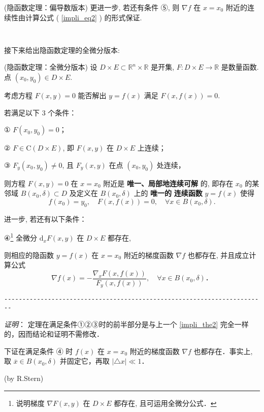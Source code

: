 \begin{theorem}{(隐函数定理：偏导数版本)}
更进一步, 若还有条件 ⑤, 则 $\nabla f$ 在 $x=x_{0}$ 附近的连续性由计算公式 ( \autoref{impli_eq2} ) 的形式保证. 
 \end{theorem}

\verb| |

接下来给出隐函数定理的全微分版本:
 \begin{theorem}{(隐函数定理：全微分版本)}
 设 $D\times E\subset\mathbb{R}^{n}\times\mathbb{R}$ 是开集, $F:D\times E\rightarrow\mathbb{R}$
是数量函数. 点 $(x_{0},y_{0})\in D\times E.$ 

考虑方程 $F(x,y)=0$ 能否解出 $y=f(x)$ 满足 $F(x,f(x))=0.$ 

若满足以下 3 个条件：

① $F(x_{0},y_{0})=0$；

② $F\in\mathrm{C}(D\times E)$, 即 $F(x,y)$ 在 $D\times E$ 上连续； 

③ $F_{y}(x_{0},y_{0})\neq0$, 且 $F_{y}(x,y)$ 在点 $(x_0,y_0)$ 处连续，

则方程 $F(x,y)=0$ 在 $x=x_{0}$ 附近是\textbf{ 唯一、局部地连续可解} 的, 即存在 $x_{0}$
的某邻域 $B(x_{0},\delta)\subset D$ 及定义在 $B(x_{0},\delta)$ 上的 \textbf{唯一的} \textbf{
连续函数} $y=f(x)$ 使得
\[
f(x_{0})=y_{0},\quad F(x,f(x))=0,\quad\forall x\in B(x_{0},\delta).
\]

进一步, 若还有以下条件：

④\footnote{说明梯度 $\nabla F(x,y)$ 在 $D\times E$ 都存在, 且可运用全微分公式．} 全微分 $\mathrm{d}_{x}F(x,y)$ 在 $D\times E$ 都存在, 

则相应的隐函数 $y=f(x)$ 在 $x=x_{0}$ 附近的梯度函数 $\nabla f$ 也都存在, 并且成立计算公式
\[
\nabla f(x)=-{\displaystyle \frac{\nabla_{x}F(x,f(x))}{F_{y}(x,f(x))}},\quad\forall x\in B(x_{0},\delta)．
\]

\verb|------------------------------------------------------------------------|

\textsl{证明}： 定理在满足条件①②③时的前半部分是与上一个 \autoref{impli_the2} 完全一样的，因而结论和证明不需修改．

下证在满足条件 ④ 时 $f(x)$ 在 $x=x_{0}$ 附近的梯度函数 $\nabla f$ 也都存在．事实上, 取 $\overline{x}\in B(x_{0},\delta)$ 并固定它，再取 $\left|\triangle x\right|\ll1$． 
 \end{theorem}
(by R.Stern)
